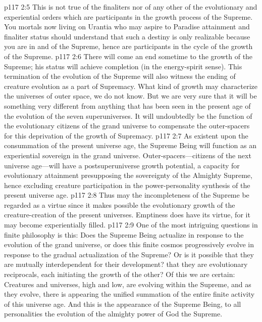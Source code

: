 \vs p117 2:5 This is not true of the finaliters nor of any other of the evolutionary and experiential orders which are participants in the growth process of the Supreme. You mortals now living on Urantia who may aspire to Paradise attainment and finaliter status should understand that such a destiny is only realizable because you are in and of the Supreme, hence are participants in the cycle of the growth of the Supreme.
\pc \vs p117 2:6 There will come an end sometime to the growth of the Supreme; his status will achieve completion (in the energy\hyp{}spirit sense). This termination of the evolution of the Supreme will also witness the ending of creature evolution as a part of Supremacy. What kind of growth may characterize the universes of outer space, we do not know. But we are very sure that it will be something very different from anything that has been seen in the present age of the evolution of the seven superuniverses. It will undoubtedly be the function of the evolutionary citizens of the grand universe to compensate the outer\hyp{}spacers for this deprivation of the growth of Supremacy.\plusone
\vs p117 2:7 As existent upon the consummation of the present universe age, the Supreme Being will function as an experiential sovereign in the grand universe. Outer\hyp{}spacers---citizens of the next universe age---will have a postsuperuniverse growth potential, a capacity for evolutionary attainment presupposing the sovereignty of the Almighty Supreme, hence excluding creature participation in the power\hyp{}personality synthesis of the present universe age.
\vs p117 2:8 Thus may the incompleteness of the Supreme be regarded as a virtue since it makes possible the evolutionary growth of the creature\hyp{}creation of the present universes. Emptiness does have its virtue, for it may become experientially filled.
\pc \vs p117 2:9 One of the most intriguing questions in finite philosophy is this: Does the Supreme Being actualize in response to the evolution of the grand universe, or does this finite cosmos progressively evolve in response to the gradual actualization of the Supreme? Or is it possible that they are mutually interdependent for their development? that they are evolutionary reciprocals, each initiating the growth of the other? Of this we are certain: Creatures and universes, high and low, are evolving within the Supreme, and as they evolve, there is appearing the unified summation of the entire finite activity of this universe age. And this is the appearance of the Supreme Being, to all personalities the evolution of the almighty power of God the Supreme.
